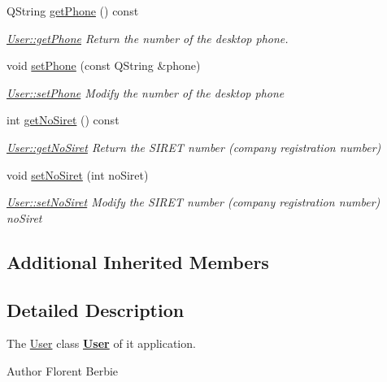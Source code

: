 \begin{DoxyCompactItemize}
Q\-String \hyperlink{classUser_a5408061a1ba87e3d56a51490464d1149}{get\-Phone} () const 
\begin{DoxyCompactList}\small\item\em \hyperlink{classUser_a5408061a1ba87e3d56a51490464d1149}{User\-::get\-Phone} Return the number of the desktop phone. \end{DoxyCompactList}\item 
void \hyperlink{classUser_a271e4179b9da5b409f98656b04431689}{set\-Phone} (const Q\-String \&phone)
\begin{DoxyCompactList}\small\item\em \hyperlink{classUser_a271e4179b9da5b409f98656b04431689}{User\-::set\-Phone} Modify the number of the desktop {\itshape phone} \end{DoxyCompactList}\item 
int \hyperlink{classUser_a721f64ecb20c42c12ca87815ffb0a274}{get\-No\-Siret} () const 
\begin{DoxyCompactList}\small\item\em \hyperlink{classUser_a721f64ecb20c42c12ca87815ffb0a274}{User\-::get\-No\-Siret} Return the S\-I\-R\-E\-T number (company registration number) \end{DoxyCompactList}\item 
void \hyperlink{classUser_a9e77d4724778cfe4f0a6fda75d3b7c52}{set\-No\-Siret} (int no\-Siret)
\begin{DoxyCompactList}\small\item\em \hyperlink{classUser_a9e77d4724778cfe4f0a6fda75d3b7c52}{User\-::set\-No\-Siret} Modify the S\-I\-R\-E\-T number (company registration number) {\itshape no\-Siret} \end{DoxyCompactList}\end{DoxyCompactItemize}
\subsection*{Additional Inherited Members}


\subsection{Detailed Description}
The \hyperlink{classUser}{User} class {\bfseries \hyperlink{classUser}{User}} of it application. 

\begin{DoxyAuthor}{Author}
Florent Berbie 
\end{DoxyAuthor}


